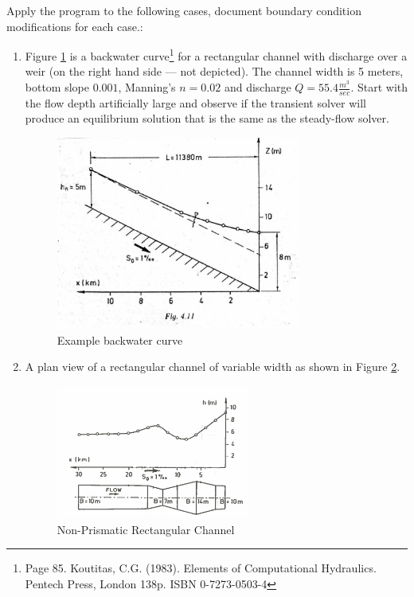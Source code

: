 \documentclass[12pt]{article}
\begin{document}
Apply the program to the following cases, document boundary condition modifications for each case.:
\begin{enumerate}

\item Figure \ref{fig:example1} is a backwater curve\footnote{Page 85. Koutitas, C.G. (1983). Elements of Computational Hydraulics. Pentech Press, London 138p. ISBN 0-7273-0503-4 } for a rectangular channel with discharge over a weir (on the right hand side --- not depicted).  The channel width is 5 meters, bottom slope $0.001$, Manning's $n=0.02$ and discharge $Q=55.4 \frac{m^3}{sec}$.  
Start with the flow depth artificially large and observe if the transient solver will produce an equilibrium solution that is the same as the steady-flow solver.  

\begin{figure}[h!] %
   \centering
   \includegraphics[height=2.5in]{bw_curve1.jpg} 
   \caption{Example backwater curve} 
   \label{fig:example1}
\end{figure}
\clearpage

\item A plan view of a rectangular channel of variable width as shown in Figure \ref{fig:NonPrismaticExample}.\\

\begin{figure}[h!] %
   \centering
   \includegraphics[width=2.5in]{NonPrismaticExample} 
   \caption{Non-Prismatic Rectangular Channel}
   \label{fig:NonPrismaticExample}
\end{figure}


\end{enumerate}
\end{document}
